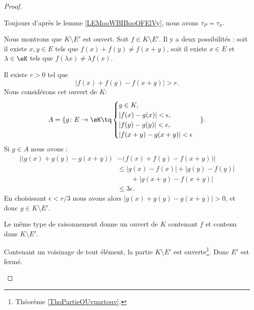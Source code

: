 \begin{proof}
\begin{subproof}
		Toujours d'après le lemme \ref{LEMooWBIBooOFElVy}, nous avons \( \tau_P=\tau_{\sigma}\).

		Nous montrons que \( K\setminus E'\) est ouvert. Soit \( f\in K\setminus E'\). Il y a deux possibilités : soit il existe \( x,y\in E\) tels que \( f(x)+f(y)\neq f(x+y)\), soit il existe \( x\in E\) et \( \lambda\in \eK\) tels que \( f(\lambda x)\neq \lambda f(x)\).
		\begin{subproof}
			\spitem[Si \( f(x)+f(y)\neq f(x+y)\)]
			Il existe \( r>0\) tel que
			\begin{equation}
				| f(x)+f(y)-f(x+y) |>r.
			\end{equation}
			Nous considérons cet ouvert de \( K\):
			\begin{equation}
				A=\{g \colon E\to \eK \tq
				\begin{cases}
					g\in K,                 \\
					| f(x)-g(x) |<\epsilon, \\
					| f(y)-g(y) |<\epsilon, \\
					| f(x+y)-g(x+y) |<\epsilon
				\end{cases}
				\}.
			\end{equation}
			Si \( g\in A\) nous avons :
			\begin{subequations}
				\begin{align}
					\Big| \big( g(x)+g(y)-g(x+y) \big) & -\big( f(x)+f(y)-f(x+y) \big) \Big| \\
					                                   & \leq | g(x)-f(x) |+| g(y)-f(y) |    \\
					                                   & \qquad +| g(x+y)-f(x+y) | \nonumber \\
					                                   & \leq 3\epsilon.
				\end{align}
			\end{subequations}
			En choisissant \( \epsilon<r/3\) nous avons alors \( | g(x)+g(y)-g(x+y) |>0\), et donc \( g\in K\setminus E'\).

			Le même type de raisonnement donne un ouvert de \( K\) contenant \( f\) et contenu dans \( K\setminus E'\).

			Contenant un voisinage de tout élément, la partie \( K\setminus E'\) est ouverte\footnote{Théorème \ref{ThoPartieOUvpartouv}.}. Donc \( E'\) est fermé.
		\end{subproof}


\end{subproof}
\end{proof}
